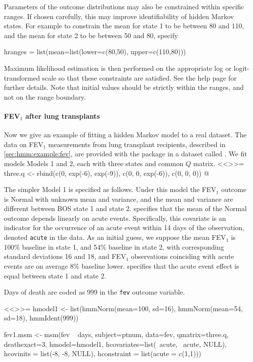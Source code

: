 Parameters of the
outcome distributions may also be constrained within specific ranges.
If chosen carefully, this may improve identifiability of hidden Markov states.
For example to constrain the mean for state 1 to be between 80 and 110,
and the mean for state 2 to be between 50 and 80, specify
\begin{Scode}
hranges = list(mean=list(lower=c(80,50), upper=c(110,80)))
\end{Scode}
Maximum likelihood estimation is then performed on the appropriate log
or logit-transformed scale so that these constraints are
satisfied. See the  help page for further details.
Note that initial values should be strictly within the ranges, and not
on the range boundary.

\paragraph{FEV$_1$ after lung transplants}

Now we give an example of fitting a hidden Markov model to a real
dataset.  The data on FEV$_1$ measurements from lung transplant
recipients, described in \ref{sec:hmm:example:fev}, are provided with
the  package in a dataset called .
We fit models Models 1 and 2, each with three states and common $Q$
matrix.
<<>>=
three.q <- rbind(c(0, exp(-6), exp(-9)), c(0, 0, exp(-6)), c(0, 0, 0))
@

The simpler Model 1 is specified as follows. Under this model the
FEV$_1$ outcome is Normal with unknown mean and variance, and the mean
and variance are different between BOS state 1 and state 2.
 specifies that the mean of the Normal outcome
depends linearly on acute events.  Specifically, this covariate is an
indicator for the occurrence of an acute event within 14 days of the
observation, denoted \texttt{acute} in the data.  As an initial guess,
we suppose the mean FEV$_1$ is 100\% baseline in state 1, and 54\%
baseline in state 2, with corresponding standard deviations 16 and 18,
and FEV$_1$ observations coinciding with acute events are on average
8\% baseline lower.  specifies that the acute
event effect is equal between state 1 and state 2.

Days of death are coded as 999 in the \texttt{fev} outcome variable.

<<>>=
hmodel1 <- list(hmmNorm(mean=100, sd=16), hmmNorm(mean=54, sd=18),
                hmmIdent(999))

fev1.msm <- msm(fev ~ days, subject=ptnum, data=fev, qmatrix=three.q,
                deathexact=3, hmodel=hmodel1,
                hcovariates=list(~acute, ~acute, NULL),
                hcovinits = list(-8, -8, NULL),
                hconstraint = list(acute = c(1,1)))

